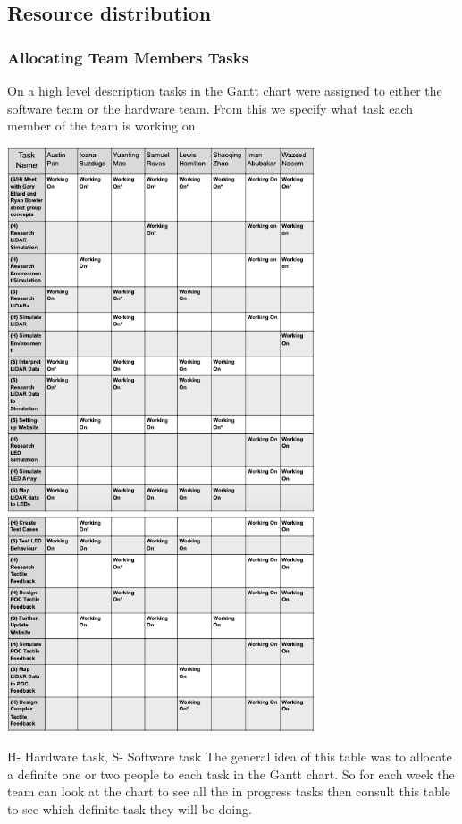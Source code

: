 \documentclass{article}
\begin{document}
\subsection{Resource distribution}
\subsubsection{Allocating Team Members Tasks}
On a high level description tasks in the Gantt chart were assigned to either the software team or the hardware team. From this we specify what task each member of the team is working on.
\begin{center}
    \includegraphics [width=0.68\textwidth]{Team Member Tasks 1.png}
    \includegraphics [width=0.68\textwidth]{Team Member Tasks2.png}
 \end{center}
H- Hardware task,
S- Software task 
\newline
The general idea of this table was to allocate a definite one or two people to each task in the Gantt chart. So for each week the team can look at the chart to see all the in progress tasks then consult this table to see which definite task they will be doing. 
\end{document}
